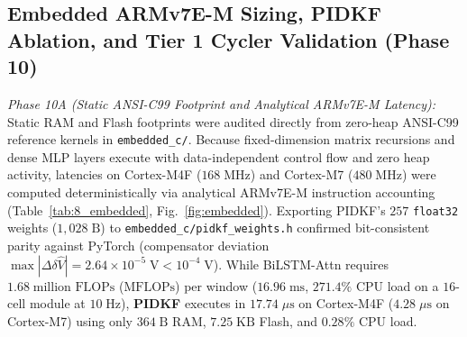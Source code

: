 \documentclass[10pt,a4paper]{article}
\providecommand{\upmu}{\mu}
\begin{document}
\subsection{Embedded ARMv7E-M Sizing, PIDKF Ablation, and Tier 1 Cycler Validation (Phase 10)\label{sec:hw_profiling}}
\emph{Phase 10A (Static ANSI-C99 Footprint and Analytical ARMv7E-M Latency):} Static RAM and Flash footprints were audited directly from zero-heap ANSI-C99 reference kernels in \texttt{embedded\_c/}. Because fixed-dimension matrix recursions and dense MLP layers execute with data-independent control flow and zero heap activity, latencies on Cortex-M4F ($168\;\mathrm{MHz}$) and Cortex-M7 ($480\;\mathrm{MHz}$) were computed deterministically via analytical ARMv7E-M instruction accounting (Table~\ref{tab:8_embedded}, Fig.~\ref{fig:embedded}). Exporting PIDKF's $257$ \texttt{float32} weights ($1,028\;\mathrm{B}$) to \texttt{embedded\_c/\allowbreak pidkf\_weights.h} confirmed bit-consistent parity against PyTorch (compensator deviation $\max|\Delta\delta\hat{V}| = 2.64\times 10^{-5}\;\mathrm{V} < 10^{-4}\;\mathrm{V}$). While BiLSTM-Attn requires $1.68\;\text{million FLOPs}$ ($\text{MFLOPs}$) per window ($16.96\;\mathrm{ms}$, $271.4\%$ CPU load on a $16$-cell module at $10\;\mathrm{Hz}$), \textbf{PIDKF} executes in $17.74\;\upmu\mathrm{s}$ on Cortex-M4F ($4.28\;\upmu\mathrm{s}$ on Cortex-M7) using only $364\;\mathrm{B}$ RAM, $7.25\;\mathrm{KB}$ Flash, and $0.28\%$ CPU load.
\end{document}
